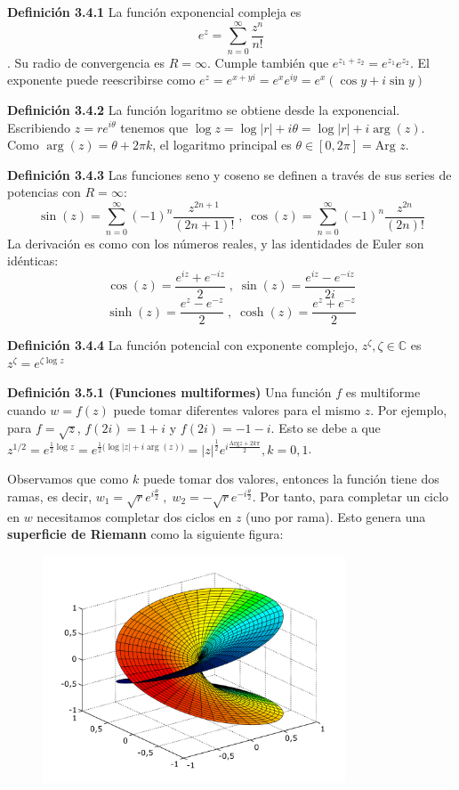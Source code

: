 \documentclass[a4paper, 11pt]{extarticle}
\newcommand{\defi}[1]{\textcolor{azul}{\textbf{Definición #1}}}
\begin{document}
\begin{multicols*}{2}
\defi{3.4.1} La función exponencial compleja es \[ e^z = \sum_{n=0}^{\infty}
\frac{z^n}{n!} \].
Su radio de convergencia es \(R = \infty\). Cumple también que \(e^{z_1+z_2}
 = e^{z_1}e^{z_2}\).
El exponente puede reescribirse como \(e^z = e^{x+yi} = e^xe^{iy} = e^x(\cos
y + i \sin y)\)

\defi{3.4.2} La función logaritmo se obtiene desde la exponencial. Escribiendo
\(z = r e^{i\theta}\) tenemos que \(\log z  = \log|r| + i\theta = \log|r| + i
\arg(z)\). Como \(\arg(z) = \theta + 2\pi k\), el logaritmo principal es \(\theta \in [0, 2\pi] = \text{Arg } z\).

\defi{3.4.3} Las funciones seno y coseno se definen a través de sus series de
potencias con \(R = \infty\):
\[ \sin(z) = \sum _{n=0}^{\infty} (-1)^n \frac{z^{2n+1}}{(2n+1)!}\;,\; 
\cos(z) = \sum _{n=0}^{\infty}(-1)^n \frac{z^{2n}}{(2n)!} \]
La derivación es como con los números reales, y las identidades de Euler son
idénticas:
\[ \cos(z) = \frac{e^{iz} + e^{-iz}}{2} \;,\; \sin(z) = \frac{e^{iz} -
e^{-iz}}{2i} \]
\[ \sinh(z) = \frac{e^z - e^{-z}}{2}\;,\; \cosh(z) = \frac{e^z + e^{-z}}{2} \]

\defi{3.4.4} La función potencial con exponente complejo, \(z^\zeta, \zeta \in
\mathbb{C}\) es \(z^{\zeta} = e^{\zeta \log z}\)

\defi{3.5.1 (Funciones multiformes)}  Una función \(f\) es multiforme cuando
\(w = f(z)\) puede tomar diferentes valores para el mismo \(z\). Por
ejemplo, para \(f = \sqrt{z}\), \(f(2i) = 1+i\) y \(f(2i) = -1-i\). 
Esto se debe a que \(z^{1/2} = e^{\frac{1}{2} \log{z}} =
e^{\frac{1}{2}(\log{|z| + i \arg(z))}} = |z|^{\frac{1}{2}}e^{i \frac{\text{Arg
}z + 2k\pi}{2}}, k = 0,1\).

Observamos que como \(k\) puede tomar dos valores, entonces la función tiene
dos ramas, es decir, \(w_1 = \sqrt{r}e^{i \frac{\theta}{2}}\;,\;w_2 =
-\sqrt{r}e^{-i \frac{\theta}{2}}\).
Por tanto, para completar un ciclo en \(w\) necesitamos completar dos ciclos
en \(z\) (uno por rama). Esto genera una \textbf{superficie de Riemann} como la
siguiente figura:

\begin{figure}[H]
\centering
\includegraphics[width=9cm]{imagenes/riemann_sqrt.png}
\end{figure}


\end{multicols*}
\end{document}
